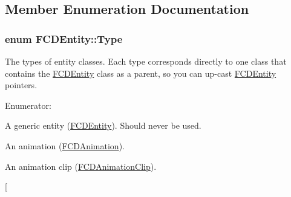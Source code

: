 \subsection{Member Enumeration Documentation}
\hypertarget{classFCDEntity_a9301a4bd5f4d4190ec13e40db4effdd7}{
\subsubsection[{Type}]{\setlength{\rightskip}{0pt plus 5cm}enum {\bf FCDEntity::Type}}}
\label{classFCDEntity_a9301a4bd5f4d4190ec13e40db4effdd7}
The types of entity classes. Each type corresponds directly to one class that contains the \hyperlink{classFCDEntity}{FCDEntity} class as a parent, so you can up-\/cast \hyperlink{classFCDEntity}{FCDEntity} pointers. \begin{Desc}
\item[Enumerator: ]\par
\begin{description}
\item[{\em 
\hypertarget{classFCDEntity_a9301a4bd5f4d4190ec13e40db4effdd7ad3c81776d7cbf8bc30f5a92aa1cdc6af}{
ENTITY}
\label{classFCDEntity_a9301a4bd5f4d4190ec13e40db4effdd7ad3c81776d7cbf8bc30f5a92aa1cdc6af}
}]A generic entity (\hyperlink{classFCDEntity}{FCDEntity}). Should never be used. \item[{\em 
\hypertarget{classFCDEntity_a9301a4bd5f4d4190ec13e40db4effdd7ad056f9a0c0836aa9add7e10969736fd5}{
ANIMATION}
\label{classFCDEntity_a9301a4bd5f4d4190ec13e40db4effdd7ad056f9a0c0836aa9add7e10969736fd5}
}]An animation (\hyperlink{classFCDAnimation}{FCDAnimation}). \item[{\em 
\hypertarget{classFCDEntity_a9301a4bd5f4d4190ec13e40db4effdd7a71cf4ef98b4af310de2fca7cfd3c6b63}{
ANIMATION\_\-CLIP}
\label{classFCDEntity_a9301a4bd5f4d4190ec13e40db4effdd7a71cf4ef98b4af310de2fca7cfd3c6b63}
}]An animation clip (\hyperlink{classFCDAnimationClip}{FCDAnimationClip}). \item[{\em 
\hypertarget{classFCDEntity_a9301a4bd5f4d4190ec13e40db4effdd7a079dc3be01f63d3552374a7717f23f8f}{
}}
\end{description}
\end{Desc}
